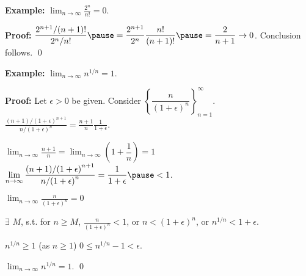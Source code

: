 \documentclass[10pt,aspectratio=169]{beamer}
\begin{document}
\begin{frame}

\textbf{Example:}
$\displaystyle
\lim_{n\to\infty} \frac{2^n}{n!} = 0$.

\pause
\medskip

\textbf{Proof:}
\quad
$\displaystyle
\frac{2^{n+1} / (n+1)!}{2^n/n!}
\pause
=
\frac{2^{n+1}}{2^n}\frac{n!}{(n+1)!}
\pause
=
\frac{2}{n+1} \to 0$.
\pause
\quad Conclusion follows. \qed

\pause
\medskip

\textbf{Example:}
$\displaystyle
\lim_{n\to\infty} n^{1/n} = 1$.

\pause
\textbf{Proof:}
Let $\epsilon > 0$ be given. 
\pause
Consider
$\left\{ \dfrac{n}{{(1+\epsilon)}^n} \right\}_{n=1}^\infty$.
\pause
%
\quad
$\displaystyle
\frac{(n+1)/{(1+\epsilon)}^{n+1}}{n/{(1+\epsilon)}^{n}}
=
\frac{n+1}{n} \frac{1}{1+\epsilon} .
$

\pause
\medskip

$\displaystyle
\lim_{n\to\infty} \frac{n+1}{n}
= \lim_{n\to\infty} \left(1+\dfrac{1}{n} \right) = 1$
\pause
\wthus
$\displaystyle
\lim_{n\to \infty} \frac{(n+1)/{(1+\epsilon)}^{n+1}}{n/{(1+\epsilon)}^{n}}
=
\frac{1}{1+\epsilon}  \pause < 1$.

\pause
\medskip

\thus 
\quad
$\displaystyle \lim_{n\to\infty} \frac{n}{{(1+\epsilon)}^n} = 0$

\pause
\thus \quad
$\exists$ $M$, s.t. for $n \geq M$,
$\frac{n}{{(1+\epsilon)}^n} < 1$,
\pause
\quad or \quad
$n < {(1+\epsilon)}^n$,
\pause
\quad or \quad
$n^{1/n} < 1+\epsilon$.

\pause
\medskip

$n^{1/n} \geq 1$ (as $n \geq 1$)
\pause
\wthus
$0 \leq n^{1/n}-1 < \epsilon$.

\pause
\medskip

\thus \quad
$\displaystyle \lim_{n\to\infty} n^{1/n} = 1$. \qed

\end{frame}

%
%
%
%
\end{document}
